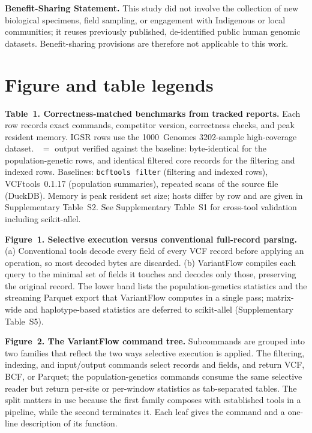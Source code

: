\documentclass[11pt]{article}
\begin{document}
\vspace{0.6em}
\noindent\textbf{Benefit-Sharing Statement.} This study did not involve the
collection of new biological specimens, field sampling, or engagement with
Indigenous or local communities; it reuses previously published, de-identified
public human genomic datasets. Benefit-sharing provisions are therefore not
applicable to this work.

\clearpage
\section*{Figure and table legends}

\noindent\textbf{Table~1. Correctness-matched benchmarks from tracked
reports.} Each row records exact commands, competitor version, correctness
checks, and peak resident memory. IGSR rows use the 1000~Genomes 3202-sample
high-coverage dataset. \checkmark~$=$ output verified against the baseline:
byte-identical for the population-genetic rows, and identical filtered core
records for the filtering and indexed rows. Baselines: \texttt{bcftools filter}
(filtering and indexed rows), VCFtools~0.1.17 (population summaries), repeated
scans of the source file (DuckDB). Memory is peak resident set size; hosts
differ by row and are given in Supplementary Table~S2. See Supplementary Table~S1 for cross-tool
validation including scikit-allel.

\vspace{0.9em}
\noindent\textbf{Figure~1. Selective execution versus conventional
full-record parsing.} (a) Conventional tools decode every field of every VCF
record before applying an operation, so most decoded bytes are discarded.
(b) VariantFlow compiles each query to the minimal set of fields it touches and
decodes only those, preserving the original record. The lower band lists the
population-genetics statistics and the streaming Parquet export that VariantFlow
computes in a single pass; matrix-wide and haplotype-based statistics are
deferred to scikit-allel (Supplementary Table~S5).

\vspace{0.9em}
\noindent\textbf{Figure~2. The VariantFlow command tree.} Subcommands are
grouped into two families that reflect the two ways selective execution is
applied. The filtering, indexing, and input/output commands select records and
fields, and return VCF, BCF, or Parquet; the population-genetics commands
consume the same selective reader but return per-site or per-window statistics
as tab-separated tables. The split matters in use because the first family
composes with established tools in a pipeline, while the second terminates it.
Each leaf gives the command and a one-line description of its function.
\end{document}
